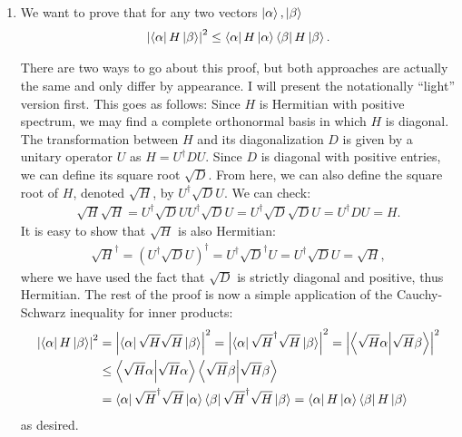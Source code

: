 \documentclass{article}
\theoremstyle{definition}
\newcommand{\al}{\alpha}
\newcommand{\be}{\beta}
\newcommand{\lp}{\left(}
\newcommand{\rp}{\right)}
\begin{document}
\begin{enumerate}[label=(\alph*)]
	\item We want to prove that for any two vectors $\ket{\al}, \ket{\be}$ 
	\begin{align*}
	\abs{\bra{\al} H \ket{\be}}^2 \leq \bra{\al}H \ket{\al} \bra{\be} H \ket{\be}.
	\end{align*}
	
	There are two ways to go about this proof, but both approaches are actually the same and only differ by appearance. I will present the notationally ``light'' version first. This goes as follows: Since $H$ is Hermitian with positive spectrum, we may find a complete orthonormal basis in which $H$ is diagonal. The transformation between $H$ and its diagonalization $D$ is given by a unitary operator $U$ as $H  = U^\dagger D U$. Since $D$ is diagonal with positive entries, we can define its square root $\sqrt{D}$. From here, we can also define the square root of $H$, denoted $\sqrt{H}$, by $U^\dagger \sqrt{D} U$. We can check:
	\begin{align*}
	\sqrt{H} \sqrt{H} = U^\dagger \sqrt{D} U U^\dagger \sqrt{D} U = U^\dagger \sqrt{D}\sqrt{D} U = U^\dagger D U = H.
	\end{align*}
	It is easy to show that $\sqrt{H}$ is also Hermitian: 
	\begin{align*}
	\sqrt{H}^\dagger = \lp U^\dagger \sqrt{D} U \rp^\dagger  = U^\dagger \sqrt{D}^\dagger U = U^\dagger \sqrt{D} U = \sqrt{H}, 
	\end{align*}
	where we have used the fact that $\sqrt{D}$ is strictly diagonal and positive, thus Hermitian. The rest of the proof is now a simple application of the Cauchy-Schwarz inequality for inner products:
	\begin{align*}
	\abs{\bra{\al} H \ket{\be}}^2 &= \abs{ \bra{\al} \sqrt{H}\sqrt{H} \ket{\be} }^2 = \abs{ \bra{\al} \sqrt{H}^\dagger \sqrt{H} \ket{\be} }^2 =  \abs{ \bra{\sqrt{H}\al}\ket{ \sqrt{H}\be} }^2 \\
	&\leq \braket{\sqrt{H}\al} \braket{\sqrt{H} \be}\\
	&= \bra{\al} \sqrt{H}^\dagger\sqrt{H}\ket{\al} \bra{\be}\sqrt{H}^\dagger\sqrt{H}\ket{ \be}= \bra{\al} {H}\ket{\al} \bra{\be}{H}\ket{ \be}
	\end{align*}
	as desired.\\
	
	
	

\end{enumerate}
\end{document}
